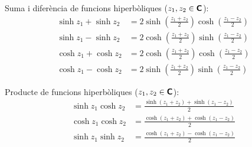 Suma i diferència de funcions hiperbòliques ($z_1,
z_2\in{\ensuremath{\boldsymbol{\mathsf{C}}}}$):
\begin{subequations}
\begin{align}
    \sinh z_1+\sinh z_2 &= 2 \sinh\left(\frac{z_1+z_2}{2}\right)
    \cosh\left(\frac{z_1-z_2}{2}\right)\\[1ex]
    \sinh z_1-\sinh z_2 &= 2 \cosh\left(\frac{z_1+z_2}{2}\right)
    \sinh\left(\frac{z_1-z_2}{2}\right)\\[1ex]
    \cosh z_1+\cosh z_2 &= 2 \cosh\left(\frac{z_1+z_2}{2}\right)
    \cosh\left(\frac{z_1-z_2}{2}\right)\\[1ex]
    \cosh z_1-\cosh z_2 &= 2 \sinh\left(\frac{z_1+z_2}{2}\right)
    \sinh\left(\frac{z_1-z_2}{2}\right)
\end{align}
\end{subequations}

Producte de funcions hiperbòliques ($z_1, z_2\in{\ensuremath{\boldsymbol{\mathsf{C}}}}$):
\begin{subequations}
\begin{align}
    \sinh z_1 \cosh z_2 &=
    \frac{\sinh(z_1+z_2)+\sinh(z_1-z_2)}{2}\\[1ex]
    \cosh z_1 \cosh z_2 &=
    \frac{\cosh(z_1+z_2)+\cosh(z_1-z_2)}{2}\\[1ex]
    \sinh z_1 \sinh z_2 &=
    \frac{\cosh(z_1+z_2)-\cosh(z_1-z_2)}{2}
\end{align}
\end{subequations}
